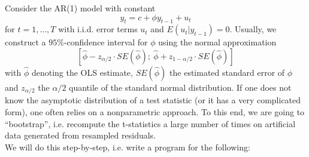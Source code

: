 Consider the AR(1) model with constant
\begin{equation*}
    y_{t}=c +\phi y_{t-1}+u_{t}
\end{equation*}
for $t=1,\ldots ,T$ with i.i.d. error terms $u_{t}$ and $E(u_{t}|y_{t-1})=0$.
Usually, we construct a $95\%$-confidence interval for $\phi$ using the normal approximation
\begin{equation*}
    \left[ \hat{\phi}-z_{\alpha/2}\cdot SE(\hat{\phi});\ \hat{\phi}+z_{1-\alpha/2}\cdot SE(\hat{\phi})\right]
\end{equation*}
with $\hat{\phi}$ denoting the OLS estimate, $SE(\hat{\phi})$ the estimated standard error of $\phi$ and $z_{\alpha/2}$ the $\alpha/2$ quantile of the standard normal distribution. If one does not know the asymptotic distribution of a test statistic (or it has a very complicated form), one often relies on a nonparametric approach. To this end, we are going to \enquote{bootstrap}, i.e. recompute the t-statistics a large number of times on artificial data generated from resampled residuals.\\
We will do this step-by-step, i.e. write a program for the following:
